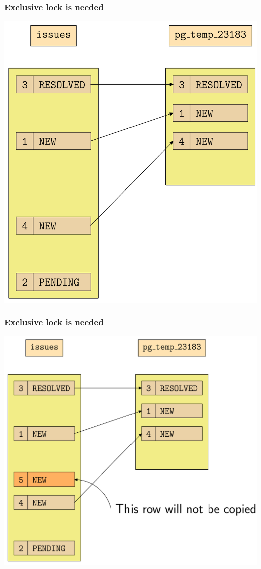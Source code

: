 \begin{frame}
  \frametitle{Exclusive lock is needed}
  \begin{center}
    \includegraphics[height=\sizeforimages\textheight]{images/exclusive_lock_needed_03.png}
  \end{center}
\end{frame}

\begin{frame}
  \frametitle{Exclusive lock is needed}
  \begin{center}
    \includegraphics[height=\sizeforimages\textheight]{images/exclusive_lock_needed_04.png}
  \end{center}
\end{frame}

